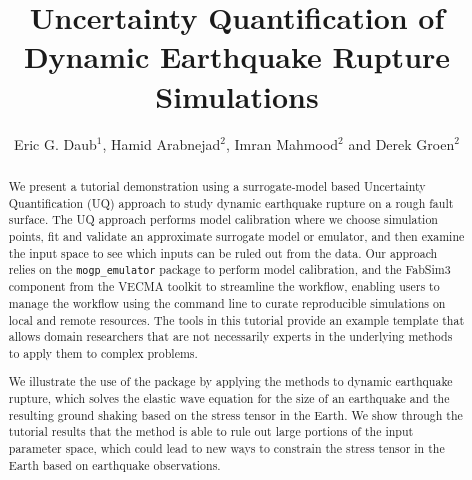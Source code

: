 \documentclass[openacc]{rstransa}%
\begin{document}
\title{Uncertainty Quantification of Dynamic Earthquake Rupture Simulations}

\author{%
Eric G. Daub$^{1}$, Hamid Arabnejad$^{2}$, Imran Mahmood$^{2}$ and Derek Groen$^{2}$}

\address{$^{1}$Research Engineering Group, Alan Turing Institute, London, UK\\
$^{2}$Department of Computer Science, Brunel University London, London, UK}

\subject{Geophysics, Computer modelling and simulation}



\begin{abstract}

We present a tutorial demonstration using a surrogate-model based Uncertainty Quantification (UQ)
approach to study dynamic earthquake rupture on a rough fault surface. The UQ approach performs
model calibration where we choose simulation points, fit and validate an approximate surrogate
model or emulator, and then examine the input space to see which inputs can be ruled out from the data.
Our approach relies on the \texttt{mogp\_emulator} package to perform model calibration,
and the FabSim3 component from
the VECMA toolkit to streamline the workflow, enabling users to manage the workflow using the
command line to curate reproducible simulations on local and remote resources.
The tools in this tutorial provide an example template that allows domain researchers that are
not necessarily experts in the underlying
methods to apply them to complex problems.

We illustrate the use of the package by applying the methods to dynamic earthquake rupture, which solves
the elastic wave equation for the size of an earthquake and the resulting ground shaking based on the
stress tensor in the Earth. We show through the tutorial results that the method is able to rule out
large portions of the input parameter space, which could lead to new ways to constrain the stress tensor
in the Earth based on earthquake observations.

\end{abstract}
\end{document}
